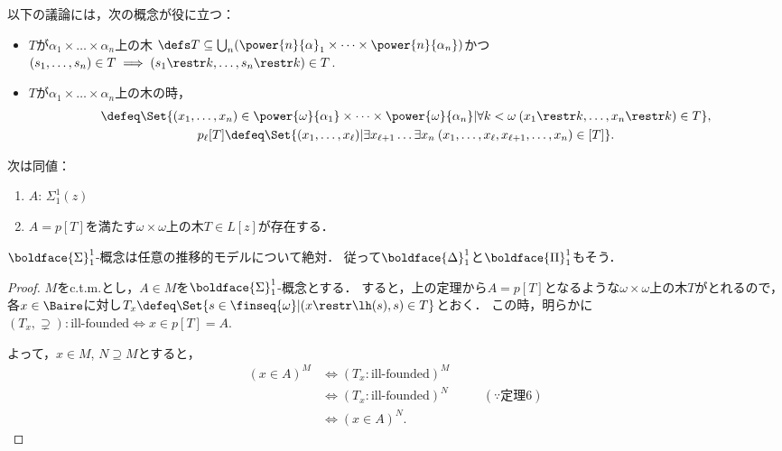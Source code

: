 \documentclass[xelatex,a4j,jadriver=standard]{bxjsarticle}
\begin{document}
以下の議論には，次の概念が役に立つ：

\begin{definition}
 \begin{itemize}
  \item $T$が$\alpha_1 \times \dots \times \alpha_n$上の木
        $\defs T \subseteq \bigcup_n (\power{n}{\alpha}_1 \times \dots \times \power{n}{\alpha_n})$かつ$(s_1, \dots, s_n) \in T \implies (s_1 \restr k, \dots, s_n \restr k) \in T$.
  \item $T$が$\alpha_1 \times \dots \times \alpha_n$上の木の時，
        \begin{gather*}[]
         [T] \defeq \Set{(x_1, \dots, x_n) \in \power{\omega}{\alpha_1} \times \dots \times \power{\omega}{\alpha_n} | \forall k < \omega \: (x_1 \restr k, \dots, x_n \restr k) \in T},\\
         p_\ell[T] \defeq \Set{ (x_1, \dots, x_\ell) | \exists x_{\ell+1}\dots \exists x_{n}\: (x_1, \dots, x_{\ell}, x_{\ell+1}, \dots, x_n) \in [T] }.
        \end{gather*}
 \end{itemize}
\end{definition}

\begin{theorem}
 次は同値：
 \begin{enumerate}
  \item $A$: $\Sigma^1_1(z)$
  \item $A = p[T]$を満たす$\omega\times\omega$上の木$T \in L[z]$が存在する．
 \end{enumerate}
\end{theorem}

\begin{theorem}
 $\boldface{\Sigma}^1_1$-概念は任意の推移的モデルについて絶対．
 従って$\boldface{\Delta}^1_1$と$\boldface{\Pi}^1_1$もそう．
\end{theorem}

\begin{proof}
 $M$をc.t.m.とし，$A \in M$を$\boldface{\Sigma}^1_1$-概念とする．
 すると，上の定理から$A = p[T]$となるような$\omega \times \omega$上の木$T$がとれるので，
 各$x \in \Baire$に対し$T_x \defeq \Set{s \in \finseq{\omega} | (x \restr \lh(s), s) \in T}$とおく．
 この時，明らかに$(T_x, \supsetneq): \text{ill-founded} \iff x \in p[T] = A$.
 
 よって，$x \in M$, $N \supseteq M$とすると，
 \begin{align*}
  (x \in A)^{M} &\iff (T_x: \text{ill-founded})^M\\
  &\iff (T_x: \text{ill-founded})^N &\quad& (\because \text{定理}6)\\
  &\iff (x \in A)^N.
 \end{align*}
\end{proof}
\end{document}
